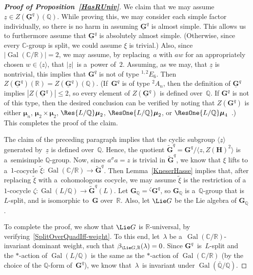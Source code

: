\documentclass[pdftex]{sigma}
\DeclareMathOperator{\Gal}{Gal}
\numberwithin{equation}{section}
\begin{document}
\begin{proof}[\bf Proof of Proposition~\ref{HasRUniv}]
We claim that we may assume $\underline z \in Z(\underline{\mathbf{G}}^q)(\mathbb{Q})$.
While proving this, we may consider each simple factor individually, so there is no harm in assuming
$\underline{\mathbf{G}}^q$ is almost simple.
This allows us to furthermore assume that $\underline{\mathbf{G}}^q$ is absolutely almost simple.
(Otherwise, since every $\mathbb{C}$-group is split, we could assume $\xi$ is trivial.) Also, since
$|{\Gal(\mathbb{C}/\mathbb{R})}| = 2$, we may assume, by replacing~$a$ with $aw$ for an appropriately chosen $w \in
\langle z \rangle$, that $|\underline z|$~is a~power of~$2$.
Assuming, as we may, that $\underline z$ is nontrivial, this implies that $\mathbf{G}^q$ is not of type ${}^{1,2} E_6$.
Then $Z(\underline{\mathbf{G}}^q)(\mathbb{R}) = Z(\underline{\mathbf{G}}^q)(\mathbb{Q})$.
(If~$\mathbf{G}^q$ is of type ${}^2 A_n$, then the def\/inition of $\underline{\mathbf{G}}^q$ implies
$|Z(\underline{\mathbf{G}}^q)| \le 2$, so every element of $Z(\underline{\mathbf{G}}^q)$ is def\/ined over~$\mathbb{Q}$.
If $\mathbf{G}^q$ is not of this type, then the desired conclusion can be verif\/ied by noting that $Z(\mathbf{G}^q)$ is
either $\boldsymbol\mu_n$, $\boldsymbol\mu_2 \times \boldsymbol\mu_2$, $\Res{L/\mathbb{Q}} \boldsymbol\mu_2$,
$\ResOne{L/\mathbb{Q}} \boldsymbol\mu_2$, or $\ResOne{L/\mathbb{Q}}
\boldsymbol\mu_4$~\cite[p.~332]{PlatonovRapinchukBook}.) This completes the proof of the claim.

The claim of the preceding paragraph implies that the cyclic subgroup $\langle \underline z \rangle$ generated
by~$\underline z$ is def\/ined over~$\mathbb{Q}$.
Hence, the quotient $\widetilde{\mathbf{G}}^q = \mathbf{G}^q/\langle z, Z(\mathbf{H})^2 \rangle$ is a~semisimple
$\mathbb{Q}$-group.
Now, since $a {}^\sigma a = z$ is trivial in $\widetilde{\mathbf{G}}^q$, we know that $\xi$ lifts to a~$1$-cocycle
$\widetilde\xi \colon \Gal(\mathbb{C}/\mathbb{R}) \to \widetilde{\mathbf{G}}^q$.
Then Lemma~\ref{KneserHasse} implies that, after replacing $\widetilde\xi$ with a~cohomologous cocycle, we may assume
$\widetilde\xi$ is the restriction of a~$1$-cocycle $\zeta \colon \Gal(L/\mathbb{Q}) \to \widetilde{\mathbf{G}}^q(L)$.
Let $\mathbf{G}_\mathbb{Q} = {}^\zeta \mathbf{G}^q$, so $\mathbf{G}_\mathbb{Q}$ is a~$\mathbb{Q}$-group that
is~$L$-split, and is isomorphic to~$\mathbf{G}$ over~$\mathbb{R}$.
Also, let $\Lie G$ be the Lie algebra of $\mathbf{G}_\mathbb{Q}$.

To complete the proof, we show that $\Lie G$ is $\mathbb{R}$-universal, by verifying~\eqref{SplitOverQuadIff-weight}.
To this end, let~$\lambda$ be a~$\Gal(\mathbb{C}/\mathbb{R})$-invariant dominant weight, such that $\beta_{\Lie
G,\mathbb{R}}(\lambda) = 0$.
Since $\mathbf{G}^q$~is~$L$-split and the $*$-action of $\Gal(L/\mathbb{Q})$ is the same as the $*$-action of
$\Gal(\mathbb{C}/\mathbb{R})$ (by the choice of the $\mathbb{Q}$-form of~$\mathbf{G}^q$), we know that~$\lambda$~is
invariant under $\Gal(\overline{\mathbb{Q}}/\mathbb{Q})$.


\end{proof}
\end{document}
